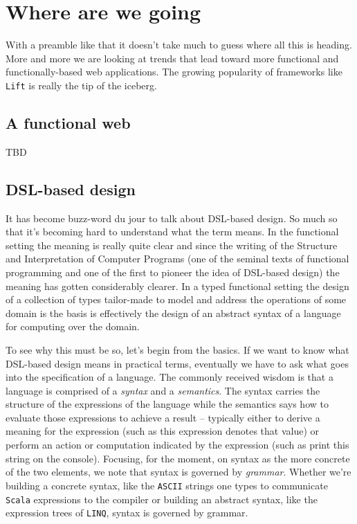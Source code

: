 \section{Where are we going}

With a preamble like that it doesn't take much to guess where all this
is heading. More and more we are looking at trends that lead toward
more functional and functionally-based web applications. The growing
popularity of frameworks like \texttt{Lift} is really the tip of the
iceberg.

\subsection{A functional web}

TBD

\subsection{DSL-based design}

It has become buzz-word du jour to talk about DSL-based design. So
much so that it's becoming hard to understand what the term means. In
the functional setting the meaning is really quite clear and since the
writing of the Structure and Interpretation of Computer Programs (one
of the seminal texts of functional programming and one of the first to
pioneer the idea of DSL-based design) the meaning has gotten
considerably clearer. In a typed functional setting the design of a
collection of types tailor-made to model and address the operations of
some domain is the basis is effectively the design of an abstract
syntax of a language for computing over the domain.

To see why this must be so, let's begin from the basics. If we want to
know what DSL-based design means in practical terms, eventually we
have to ask what goes into the specification of a language. The
commonly received wisdom is that a language is comprised of a
\emph{syntax} and a \emph{semantics}. The syntax carries the structure
of the expressions of the language while the semantics says how to
evaluate those expressions to achieve a result -- typically either to
derive a meaning for the expression (such as this expression denotes
that value) or perform an action or computation indicated by the
expression (such as print this string on the console). Focusing, for
the moment, on syntax as the more concrete of the two elements, we
note that syntax is governed by \emph{grammar}. Whether we're building
a concrete syntax, like the \texttt{ASCII} strings one types to
communicate \texttt{Scala} expressions to the compiler or building an
abstract syntax, like the expression trees of \texttt{LINQ}, syntax is
governed by grammar.

